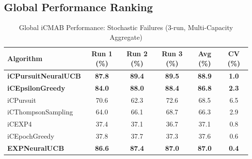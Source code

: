 \documentclass[12pt,a4paper]{article}
\newcommand{\primarytext}[1]{\textcolor{primaryblue}{\textbf{#1}}}
\newcommand{\legacy}[1]{\textcolor{legacycolor}{\textbf{#1}}}
\newcommand{\neural}[1]{\textcolor{neuralcolor}{\textbf{#1}}}
\begin{document}
\begin{tcolorbox}[colback=tableheader,colframe=primaryblue,title=\textbf{Primary iCMAB Performance Results (Stochastic Environment, Attack Rate: 0.25)}]

\subsection{Global Performance Ranking}

\begin{table}[H]
\centering
\caption{Global iCMAB Performance: Stochastic Failures (3-run, Multi-Capacity Aggregate)}
\label{tab:global-performance-stochastic}
\begin{tabular}{@{}lccccc@{}}
\toprule
\textbf{Algorithm} & \textbf{Run 1 (\%)} & \textbf{Run 2 (\%)} & \textbf{Run 3 (\%)} & \textbf{Avg (\%)} & \textbf{CV (\%)} \\
\midrule
\neural{iCPursuitNeuralUCB}   & \neural{87.8} & \neural{89.4} & \neural{89.5} & \neural{88.9} & \neural{1.0} \\
\primarytext{iCEpsilonGreedy}   & \primarytext{84.0} & \primarytext{88.0} & \primarytext{88.4} & \primarytext{86.8} & \primarytext{2.3} \\
iCPursuit                       & 70.6 & 62.3 & 72.6 & 68.5 & 6.5 \\
iCThompsonSampling              & 64.0 & 66.1 & 68.7 & 66.3 & 2.9 \\
iCEXP4                          & 37.4 & 37.1 & 36.7 & 37.1 & 0.8 \\
iCEpochGreedy                   & 37.8 & 37.7 & 37.3 & 37.6 & 0.6 \\
\legacy{EXPNeuralUCB}           & \legacy{86.6} & \legacy{87.4} & \legacy{87.0} & \legacy{87.0} & \legacy{0.4} \\
\bottomrule
\end{tabular}
\end{table}


\end{tcolorbox}
\end{document}
